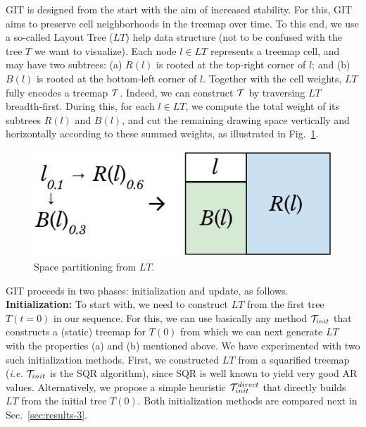 GIT is designed from the start with the aim of increased stability. For this, GIT aims to preserve cell neighborhoods in the treemap over time. To this end, we use a so-called Layout Tree ($LT$) help data structure (not to be confused with the tree $T$ we want to visualize).
Each node $l \in LT$ represents a treemap cell, and may have two subtrees: (a) $R(l)$ is rooted at the top-right corner of $l$; and (b) $B(l)$ is rooted at the bottom-left corner of $l$. Together with the cell weights, $LT$ fully encodes a treemap ${\cal T}$. Indeed, we can construct ${\cal T}$ by traversing $LT$ breadth-first.
During this, for each $l \in LT$, we compute the total weight of its subtrees $R(l)$ and $B(l)$, and cut the remaining drawing space vertically and horizontally according to these summed weights, as illustrated in Fig.~\ref{fig:space-partition}.

\begin{figure}
\centering
\includegraphics[width=.63\textwidth]{figures/treemap-algorithm/space-partition.png}
\caption{Space partitioning from $LT$.}
\label{fig:space-partition}
\end{figure}

GIT proceeds in two phases: initialization and update, as follows.\\

\noindent\textbf{Initialization:} To start with, we need to construct $LT$ from the first tree $T(t=0)$ in our sequence. For this, we can use basically any method ${\cal T}_{init}$ that constructs a (static) treemap for $T(0)$ from which we can next generate $LT$ with the properties (a) and (b) mentioned above. We have experimented with two such initialization methods. First, we constructed $LT$ from a squarified treemap (\emph{i.e.} ${\cal T}_{init}$ is the SQR algorithm), since SQR is well known to yield very good AR values. Alternatively, we propose a simple heuristic ${\cal T}_{init}^{direct}$ that directly builds $LT$ from the initial tree $T(0)$. Both initialization methods are compared next in Sec.~\ref{sec:results-3}.

